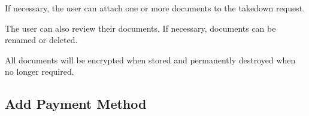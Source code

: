 \begin{minipage}{\textwidth}
  \centering
  \begin{minipage}[t]{4.6cm}
    \vspace{0pt}
    \centering
    \begin{minipage}{4.4cm}
      If necessary, the user can attach one or more documents to the takedown request.
    \end{minipage}
  \end{minipage}
  \begin{minipage}[t]{4.6cm}
    \vspace{0pt}
    \centering
    \begin{minipage}{4.4cm}
      The user can also review their documents. If necessary, documents can be renamed or deleted.
    \end{minipage}
  \end{minipage}
  \begin{minipage}[t]{4.6cm}
    \vspace{0pt}
    \centering
    \begin{minipage}{4.4cm}
      All documents will be encrypted when stored and permanently destroyed when no longer required.
    \end{minipage}
  \end{minipage}
\end{minipage}

\subsection{Add Payment Method}

